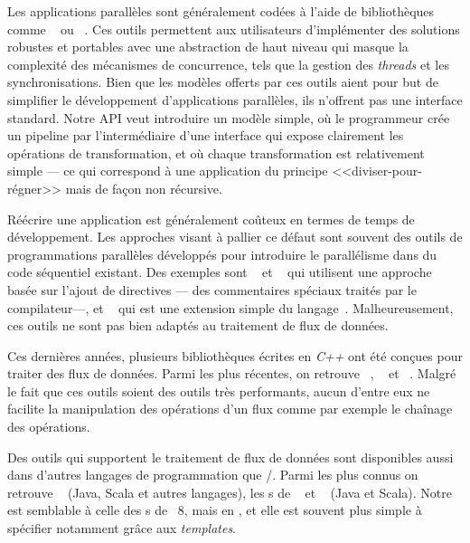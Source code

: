 \begin{introduction}
Les applications parall\`eles sont g\'en\'eralement cod\'ees \`a l'aide de biblioth\`eques comme ~\citep{AldinucciEtAl14} ou ~\citep{Reinders07}. Ces outils permettent aux utilisateurs d'implémenter des solutions robustes et portables avec une abstraction de haut niveau qui masque la complexit\'e des m\'ecanismes de concurrence, tels que la gestion des \emph{threads} et les synchronisations. Bien que les mod\`eles offerts par ces outils aient pour but de simplifier le d\'eveloppement d'applications parall\`eles, ils n'offrent pas une interface standard. Notre API veut introduire un mod\`ele simple, o\`u le programmeur cr\'ee un pipeline par l'interm\'ediaire d'une interface qui expose clairement les op\'erations de transformation, et o\`u chaque transformation est relativement simple --- ce qui correspond \`a une application du
principe <<diviser-pour-r\'egner>> mais de fa\c{c}on non r\'ecursive.

R\'e\'ecrire une application est g\'en\'eralement co\^uteux en termes de temps de d\'eveloppement. Les approches visant \`a pallier ce d\'efaut sont souvent des outils de programmations parall\`eles d\'evelopp\'es pour introduire le parall\'elisme dans du code s\'equentiel existant. Des exemples sont ~\citep{ChandraEtAl01} et ~\citep{farber2016parallel} qui utilisent une approche bas\'ee sur l'ajout de directives --- des commentaires sp\'eciaux trait\'es par le compilateur---, et ~\citep{leiserson1998programming} qui est une extension simple du langage~. Malheureusement, ces outils ne sont pas bien adapt\'es au traitement de flux de donn\'ees.

Ces derni\`eres ann\'ees, plusieurs biblioth\`eques \'ecrites en \emph{C++} ont \'et\'e con\c {c}ues pour traiter des flux de donn\'ees. Parmi les plus r\'ecentes, on retrouve ~\citep{beard2017raftlib}, ~\citep{starPuReferenceEnLigne} et ~\citep{skePuReferenceEnLigne}. Malgr\'e le fait que ces outils soient des outils tr\`es performants, aucun d'entre eux ne facilite la manipulation des op\'erations d'un flux comme par exemple le cha\^inage des op\'erations.

Des outils qui supportent le traitement de flux de donn\'ees sont disponibles aussi dans d'autres langages de programmation que /. Parmi les plus connus on retrouve ~\citep{frampton2015mastering} (Java, Scala et autres langages), les s de ~\citep{warburton2014java} et ~\citep{flinkReferenceEnLigne} (Java et Scala). Notre  est semblable \`a celle des s de ~8, mais en , et elle est souvent plus simple \`a sp\'ecifier notamment gr\^ace aux \emph{templates}.




\end{introduction}
